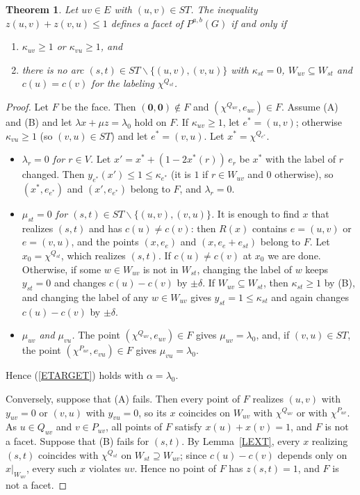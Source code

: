 \documentclass[a4paper,11pt]{article}
\newtheorem{thm}{Theorem}
\theoremstyle{definition}
\begin{document}
\begin{thm} \label{TRZ}
Let $uv \in E$ with $(u,v) \in ST$. The inequality $z(u,v) + z(v,u) \leq 1$ defines a facet of $P^{a,b}(G)$ if and only if
\begin{enumerate}
\item[(A)] $\kappa_{uv} \geq 1$ or $\kappa_{vu} \geq 1$, and
\item[(B)] there is no arc $(s,t) \in ST \backslash \{(u,v),(v,u)\}$ with $\kappa_{st} = 0$, $W_{uv} \subseteq W_{st}$ and
$c(u) = c(v)$ for the labeling $\chi^{Q_{st}}$.
\end{enumerate}
\end{thm}
\begin{proof}
Let $F$ be the face. Then $(\mathbf{0},\mathbf{0}) \notin F$ and $(\chi^{Q_{uv}}, e_{uv}) \in F$. Assume (A) and (B) and let
$\lambda x + \mu z = \lambda_0$ hold on $F$. If $\kappa_{uv} \geq 1$, let $e^* = (u,v)$; otherwise $\kappa_{vu} \geq 1$ (so $(v,u) \in ST$) and let
$e^* = (v,u)$. Let $x^* = \chi^{Q_{e^*}}$.
\begin{itemize}
\item \emph{$\lambda_r = 0$ for $r \in V$.} Let $x' = x^* + (1 - 2x^*(r))\,e_r$ be $x^*$ with the label of $r$ changed. Then
$y_{e^*}(x') \leq 1 \leq \kappa_{e^*}$ (it is $1$ if $r \in W_{uv}$ and $0$ otherwise), so $(x^*, e_{e^*})$ and $(x', e_{e^*})$ belong
to $F$, and $\lambda_r = 0$.
\item \emph{$\mu_{st} = 0$ for $(s,t) \in ST \backslash \{(u,v),(v,u)\}$.} It is enough to find $x$ that realizes $(s,t)$ and has
$c(u) \neq c(v)$: then $R(x)$ contains $e = (u,v)$ or $e = (v,u)$, and the points $(x, e_e)$ and $(x, e_e + e_{st})$ belong to $F$.
Let $x_0 = \chi^{Q_{st}}$, which realizes $(s,t)$. If $c(u) \neq c(v)$ at $x_0$ we are done. Otherwise, if some $w \in W_{uv}$ is not in $W_{st}$,
changing the label of $w$ keeps $y_{st} = 0$ and changes $c(u) - c(v)$ by $\pm\delta$. If $W_{uv} \subseteq W_{st}$, then $\kappa_{st} \geq 1$ by (B),
and changing the label of any $w \in W_{uv}$ gives $y_{st} = 1 \leq \kappa_{st}$ and again changes $c(u) - c(v)$ by $\pm\delta$.
\item \emph{$\mu_{uv}$ and $\mu_{vu}$.} The point $(\chi^{Q_{uv}}, e_{uv}) \in F$ gives $\mu_{uv} = \lambda_0$, and, if $(v,u) \in ST$, the point
$(\chi^{P_{uv}}, e_{vu}) \in F$ gives $\mu_{vu} = \lambda_0$.
\end{itemize}
Hence (\ref{ETARGET}) holds with $\alpha = \lambda_0$.

Conversely, suppose that (A) fails. Then every point of $F$ realizes $(u,v)$ with $y_{uv} = 0$ or $(v,u)$ with $y_{vu} = 0$, so its $x$ coincides
on $W_{uv}$ with $\chi^{Q_{uv}}$ or with $\chi^{P_{uv}}$. As $u \in Q_{uv}$ and $v \in P_{uv}$, all points of $F$ satisfy $x(u) + x(v) = 1$, and $F$
is not a facet. Suppose that (B) fails for $(s,t)$. By Lemma~\ref{LEXT}, every $x$ realizing $(s,t)$ coincides with $\chi^{Q_{st}}$ on
$W_{st} \supseteq W_{uv}$; since $c(u) - c(v)$ depends only on $x|_{W_{uv}}$, every such $x$ violates $uv$. Hence no point of $F$ has
$z(s,t) = 1$, and $F$ is not a facet.
\end{proof}
\end{document}
